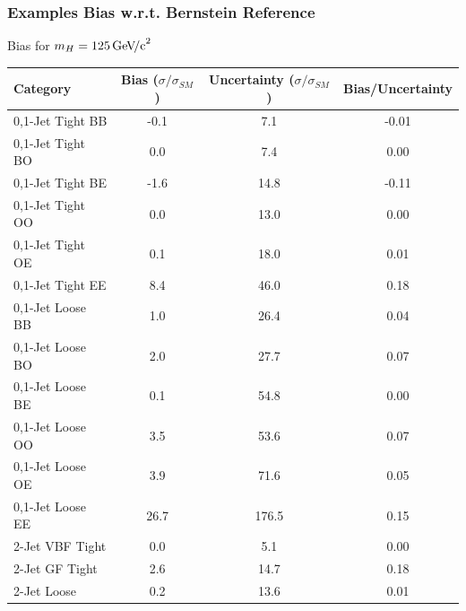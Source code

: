 \documentclass{beamer}
\newcommand{\GeVcc}{\ensuremath{\,\mathrm{Ge\kern -0.1em V\!/c}^2}}
\begin{document}
\begin{frame}
\frametitle{Examples Bias w.r.t. Bernstein Reference}
  \vspace{-1ex}
  \begin{center}
    Bias for $m_H=125\GeVcc{}$
    \\ \vspace{0.5ex}
    \scriptsize
    \begin{tabular}{|l|c|c|c|} \hline
Category                  & Bias ($\sigma/\sigma_{SM}$) & Uncertainty  ($\sigma/\sigma_{SM}$) & Bias/Uncertainty \\ \hline \hline
0,1-Jet Tight BB         &       -0.1 &        7.1 &      -0.01 \\ \hline
0,1-Jet Tight BO         &        0.0 &        7.4 &       0.00 \\ \hline
0,1-Jet Tight BE         &       -1.6 &       14.8 &      -0.11 \\ \hline
0,1-Jet Tight OO         &        0.0 &       13.0 &       0.00 \\ \hline
0,1-Jet Tight OE         &        0.1 &       18.0 &       0.01 \\ \hline
0,1-Jet Tight EE         &        8.4 &       46.0 &       0.18 \\ \hline
0,1-Jet Loose BB         &        1.0 &       26.4 &       0.04 \\ \hline
0,1-Jet Loose BO         &        2.0 &       27.7 &       0.07 \\ \hline
0,1-Jet Loose BE         &        0.1 &       54.8 &       0.00 \\ \hline
0,1-Jet Loose OO         &        3.5 &       53.6 &       0.07 \\ \hline
0,1-Jet Loose OE         &        3.9 &       71.6 &       0.05 \\ \hline
0,1-Jet Loose EE         &       26.7 &      176.5 &       0.15 \\ \hline
2-Jet VBF Tight          &        0.0 &        5.1 &       0.00 \\ \hline
2-Jet GF Tight           &        2.6 &       14.7 &       0.18 \\ \hline
2-Jet Loose              &        0.2 &       13.6 &       0.01 \\ \hline
    \end{tabular}
\\
  \small
  \end{center}
\end{frame}
\end{document}
